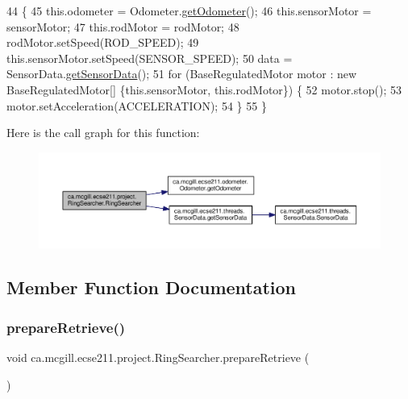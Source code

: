 \begin{DoxyCode}
44                                 \{
45     this.odometer = Odometer.\hyperlink{classca_1_1mcgill_1_1ecse211_1_1odometer_1_1_odometer_a99171f11e34dea918fa9dd069d721439}{getOdometer}();
46     this.sensorMotor = sensorMotor;
47     this.rodMotor = rodMotor;
48     rodMotor.setSpeed(ROD\_SPEED);
49     this.sensorMotor.setSpeed(SENSOR\_SPEED);
50     data = SensorData.\hyperlink{classca_1_1mcgill_1_1ecse211_1_1threads_1_1_sensor_data_a8260aba53b4474ca1275e4ce26157977}{getSensorData}();
51     \textcolor{keywordflow}{for} (BaseRegulatedMotor motor : \textcolor{keyword}{new} BaseRegulatedMotor[] \{this.sensorMotor, this.rodMotor\}) \{
52       motor.stop();
53       motor.setAcceleration(ACCELERATION);
54     \}
55   \}
\end{DoxyCode}
Here is the call graph for this function\+:\nopagebreak
\begin{figure}[H]
\begin{center}
\leavevmode
\includegraphics[width=350pt]{classca_1_1mcgill_1_1ecse211_1_1project_1_1_ring_searcher_a37eebb6cbdfd692e0979c3ca0fe2597b_cgraph}
\end{center}
\end{figure}


\subsection{Member Function Documentation}
\mbox{\label{classca_1_1mcgill_1_1ecse211_1_1project_1_1_ring_searcher_a3de30b85b1445157d7f8572992de7651}} 
\subsubsection{\texorpdfstring{prepare\+Retrieve()}{prepareRetrieve()}}
{\footnotesize\ttfamily void ca.\+mcgill.\+ecse211.\+project.\+Ring\+Searcher.\+prepare\+Retrieve (\begin{DoxyParamCaption}{ }\end{DoxyParamCaption})}

